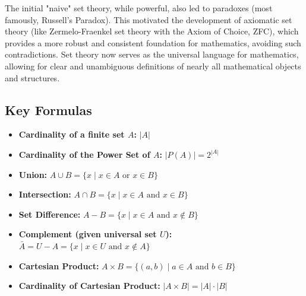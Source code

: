 \documentclass{article}
\begin{document}
The initial "naive" set theory, while powerful, also led to paradoxes (most famously, Russell's Paradox). This motivated the development of axiomatic set theory (like Zermelo-Fraenkel set theory with the Axiom of Choice, ZFC), which provides a more robust and consistent foundation for mathematics, avoiding such contradictions. Set theory now serves as the universal language for mathematics, allowing for clear and unambiguous definitions of nearly all mathematical objects and structures.

\subsection{Key Formulas}
\begin{itemize}
    \item \textbf{Cardinality of a finite set $A$:} $|A|$
    \item \textbf{Cardinality of the Power Set of $A$:} $|P(A)| = 2^{|A|}$
    \item \textbf{Union:} $A \cup B = \{x \mid x \in A \text{ or } x \in B\}$
    \item \textbf{Intersection:} $A \cap B = \{x \mid x \in A \text{ and } x \in B\}$
    \item \textbf{Set Difference:} $A - B = \{x \mid x \in A \text{ and } x \notin B\}$
    \item \textbf{Complement (given universal set $U$):} $\bar{A} = U - A = \{x \mid x \in U \text{ and } x \notin A\}$
    \item \textbf{Cartesian Product:} $A \times B = \{(a, b) \mid a \in A \text{ and } b \in B\}$
    \item \textbf{Cardinality of Cartesian Product:} $|A \times B| = |A| \cdot |B|$
\end{itemize}
\end{document}
